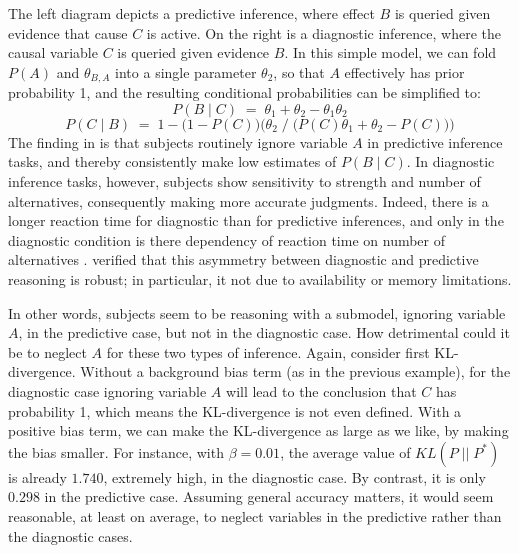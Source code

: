 \documentclass[10pt,letterpaper]{article}
\begin{document}
The left diagram depicts a predictive inference, where effect $B$ is queried given evidence that cause $C$ is active. On the right is a diagnostic inference, where the causal variable $C$ is queried given evidence $B$. In this simple model, we can fold $P(A)$ and $\theta_{B,A}$ into a single parameter $\theta_2$, so that $A$ effectively has prior probability 1, and the resulting conditional probabilities can be simplified to: 
$$P(B\mid C) \;= \; \theta_1 + \theta_2 - \theta_1\theta_2$$
$$P(C \mid B) \;= \; 1- \big(1-P(C)\big)\Big(\theta_2\;/\;\big(P(C)\theta_1 + \theta_2  - P(C)\big)\Big)$$
The finding in \cite{Fernbach2011} is that subjects routinely ignore variable $A$ in predictive inference tasks, and thereby consistently make low estimates of $P(B\mid C)$. In diagnostic inference tasks, however, subjects show sensitivity to strength and number of alternatives, consequently making more accurate judgments. Indeed, there is a longer reaction time for diagnostic than for predictive inferences, and only in the diagnostic condition is there dependency of reaction time on number of alternatives \citep{Fernbach2010}. \cite{Fernbach2013} verified that this asymmetry between diagnostic and predictive reasoning is robust; in particular, it not due to availability or memory limitations.

In other words, subjects seem to be reasoning with a submodel, ignoring variable $A$, in the predictive case, but not in the diagnostic case. How detrimental could it be to neglect $A$ for these two types of inference. Again, consider first KL-divergence. Without a background bias term (as in the previous example), for the diagnostic case ignoring variable $A$ will lead to the conclusion that $C$ has probability 1, which means the KL-divergence is not even defined. With a positive bias term, we can make the KL-divergence as large as we like, by making the bias smaller. For instance, with $\beta = 0.01$, the average value of $KL(P\;||\;P^*)$ is already $1.740$, extremely high, in the diagnostic case. By contrast, it is only $0.298$ in the predictive case. Assuming general accuracy matters, it would seem reasonable, at least on average, to neglect variables in the predictive rather than the diagnostic cases.
\end{document}
